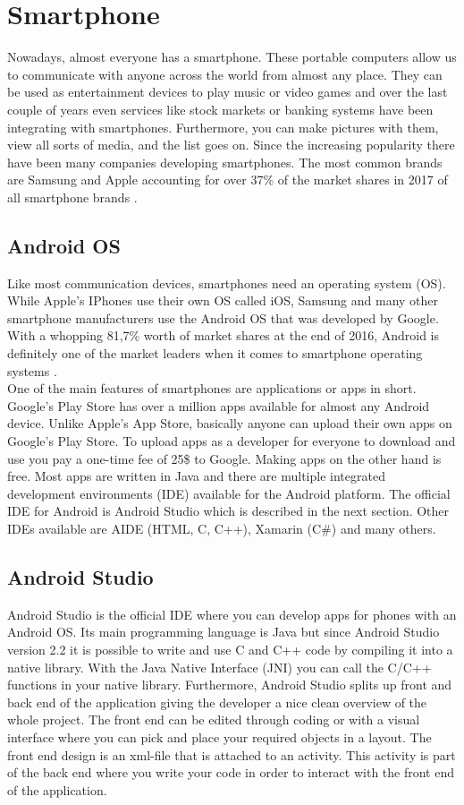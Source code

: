 \documentclass[a4paper, 11pt]{report}
\begin{document}
\section{Smartphone}
Nowadays, almost everyone has a smartphone. These portable computers allow us to communicate with anyone across the world from almost any place. They can be used as entertainment devices to play music or video games and over the last couple of years even services like stock markets or banking systems have been integrating with smartphones. Furthermore, you can make pictures with them, view all sorts of media, and the list goes on. Since the increasing popularity there have been many companies developing smartphones. The most common brands are Samsung and Apple accounting for over 37\% of the market shares in 2017 of all smartphone brands \cite{SmartphoneShares}.
	\subsection{Android OS}
Like most communication devices, smartphones need an operating system (OS). While Apple's IPhones use their own OS called iOS, Samsung and many other smartphone manufacturers use the Android OS that was developed by Google. With a whopping 81,7\% worth of market shares at the end of 2016, Android is definitely one of the market leaders when it comes to smartphone operating systems \cite{OSShares}.\\
One of the main features of smartphones are applications or apps in short. Google's Play Store has over a million apps available for almost any Android device. Unlike Apple's App Store, basically anyone can upload their own apps on Google's Play Store. To upload apps as a developer for everyone to download and use you pay a one-time fee of 25\$ to Google. Making apps on the other hand is free. Most apps are written in Java and there are multiple integrated development environments (IDE) available for the Android platform. The official IDE for Android is Android Studio which is described in the next section. Other IDEs available are AIDE (HTML, C, C++), Xamarin (C\#) and many others.
	\subsection{Android Studio}
Android Studio is the official IDE where you can develop apps for phones with an Android OS. Its main programming language is Java but since Android Studio version 2.2 it is possible to write and use C and C++ code by compiling it into a native library. With the Java Native Interface (JNI) you can call the C/C++ functions in your native library. Furthermore, Android Studio splits up front and back end of the application giving the developer a nice clean overview of the whole project. The front end can be edited through coding or with a visual interface where you can pick and place your required objects in a layout. The front end design is an xml-file that is attached to an activity. This activity is part of the back end where you write your code in order to interact with the front end of the application.
\end{document}
